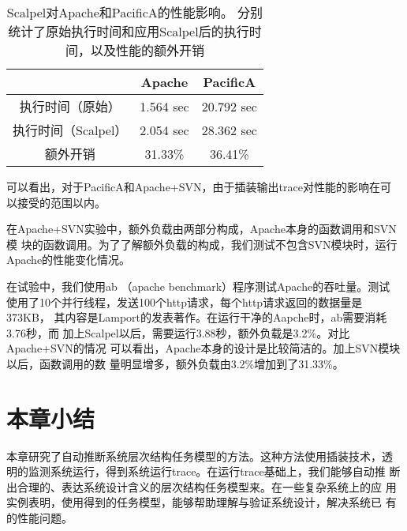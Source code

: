 \begin{table}[htbp]
\small
\centering
\begin{minipage}{0.8\linewidth}
\centering
\caption{Scalpel对Apache和PacificA的性能影响。
分别统计了原始执行时间和应用Scalpel后的执行时间，以及性能的额外开销}
\label{fig:perf}
\begin{tabular}{ccc}

\toprule[1.5pt]
  		& Apache	& PacificA \\
\midrule[1pt]
执行时间（原始）& 1.564 sec	& 20.792 sec \\
执行时间（Scalpel）& 2.054 sec	& 28.362 sec \\
额外开销	& 31.33\%       & 36.41\% \\
\bottomrule[1.5pt]
\end{tabular}
\end{minipage}
\end{table}

可以看出，对于PacificA和Apache+SVN，由于插装输出trace对性能的影响在可
以接受的范围以内。

在Apache+SVN实验中，额外负载由两部分构成，Apache本身的函数调用和SVN模
块的函数调用。为了了解额外负载的构成，我们测试不包含SVN模块时，运行
Apache的性能变化情况。

在试验中，我们使用ab （apache benchmark）程序测试Apache的吞吐量。测试
使用了10个并行线程，发送100个http请求，每个http请求返回的数据量是373KB，
其内容是Lamport的发表著作。在运行干净的Aapche时，ab需要消耗3.76秒，而
加上Scalpel以后，需要运行3.88秒，额外负载是3.2\%。对比Apache+SVN的情况
可以看出，Apache本身的设计是比较简洁的。加上SVN模块以后，函数调用的数
量明显增多，额外负载由3.2\%增加到了31.33\%。

\section{本章小结}
\label{sec:scp:conclusion}

本章研究了自动推断系统层次结构任务模型的方法。这种方法使用插装技术，透
明的监测系统运行，得到系统运行trace。在运行trace基础上，我们能够自动推
断出合理的、表达系统设计含义的层次结构任务模型来。在一些复杂系统上的应
用实例表明，使用得到的任务模型，能够帮助理解与验证系统设计，解决系统已
有的性能问题。

